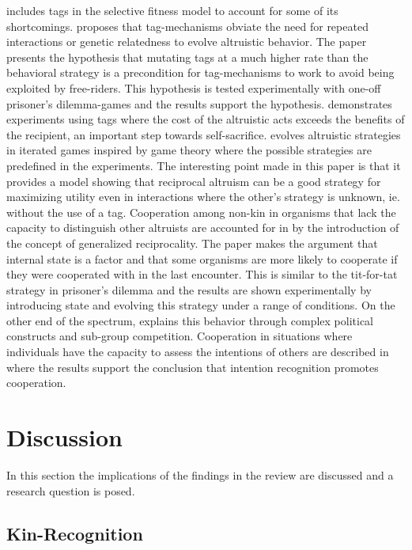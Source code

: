 \documentclass[a4paper]{book}
\begin{document}
\cite{ozisik_effects_2012} includes tags in the selective fitness model to account for some of its shortcomings.
\cite{hales_change_2005} proposes that tag-mechanisms obviate the need for repeated interactions or genetic relatedness to evolve altruistic behavior. The paper presents the hypothesis that mutating tags at a much higher rate than the behavioral strategy is a precondition for tag-mechanisms to work to avoid being exploited by free-riders. This hypothesis is tested experimentally with one-off prisoner's dilemma-games and the results support the hypothesis.
\cite{spector_genetic_2006} demonstrates experiments using tags where the cost of the altruistic acts exceeds the benefits of the recipient, an important step towards self-sacrifice.
\cite{mayoh_evolution_2000-1} evolves altruistic strategies in iterated games inspired by game theory where the possible strategies are predefined in the experiments. The interesting point made in this paper is that it provides a model showing that reciprocal altruism can be a good strategy for maximizing utility even in interactions where the other's strategy is unknown, ie. without the use of a tag. 
Cooperation among non-kin in organisms that lack the capacity to distinguish other altruists are accounted for in \cite{barta_cooperation_2010} by the introduction of the concept of generalized reciprocality. The paper makes the argument that internal state is a factor and that some organisms are more likely to cooperate if they were cooperated with in the last encounter. This is similar to the tit-for-tat strategy in prisoner's dilemma and the results are shown experimentally by introducing state and evolving this strategy under a range of conditions.
On the other end of the spectrum, \cite{dessalles_coalition_1999} explains this behavior through complex political constructs and sub-group competition. Cooperation in situations where individuals have the capacity to assess the intentions of others are described in \cite{han_role_2011} where the results support the conclusion that intention recognition promotes cooperation.


\chapter{Discussion}
\label{cha:discussion}

In this section the implications of the findings in the review are discussed and a research question is posed.

\section{Kin-Recognition}
\end{document}

